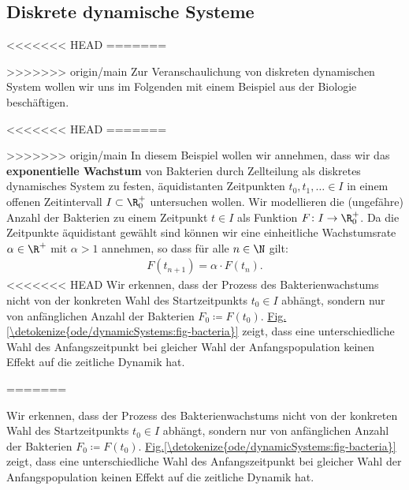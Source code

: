 \documentclass[letterpaper,10pt,english]{jupyterBook}
\begin{document}
\subsection{Diskrete dynamische Systeme}
\label{\detokenize{ode/dynamicSystems:diskrete-dynamische-systeme}}
<<<<<<< HEAD
=======
\par
>>>>>>> origin/main
Zur Veranschaulichung von diskreten dynamischen System wollen wir uns im Folgenden mit einem Beispiel aus der Biologie beschäftigen.
\label{ode/dynamicSystems:ex:bacteria}
\begin{example}{}{}



<<<<<<< HEAD
=======
\par
>>>>>>> origin/main
In diesem Beispiel wollen wir annehmen, dass wir das \textbf{exponentielle Wachstum} von Bakterien durch Zellteilung als diskretes dynamisches System zu festen, äquidistanten Zeitpunkten \(t_0, t_1, \ldots \in I\) in einem offenen Zeitintervall \(I\subset\R^+_0\) untersuchen wollen.
Wir modellieren die (ungefähre) Anzahl der Bakterien zu einem Zeitpunkt \(t \in I\) als Funktion \(F \colon I \rightarrow \R_0^+\).
Da die Zeitpunkte äquidistant gewählt sind können wir eine einheitliche Wachstumsrate \(\alpha \in \R^+\) mit \(\alpha > 1\) annehmen, so dass für alle \(n \in \N\) gilt:
\begin{align*}
F(t_{n+1}) = \alpha \cdot F(t_n).
\end{align*}
<<<<<<< HEAD
Wir erkennen, dass der Prozess des Bakterienwachstums nicht von der konkreten Wahl des Startzeitpunkts \(t_0 \in I\) abhängt, sondern nur von anfänglichen Anzahl der Bakterien \(F_0 \coloneqq F(t_0)\). \hyperref[\detokenize{ode/dynamicSystems:fig-bacteria}]{Fig.\@ \ref{\detokenize{ode/dynamicSystems:fig-bacteria}}} zeigt, dass eine unterschiedliche Wahl des Anfangszeitpunkt bei gleicher Wahl der Anfangspopulation keinen Effekt auf die zeitliche Dynamik hat.

=======
\par
Wir erkennen, dass der Prozess des Bakterienwachstums nicht von der konkreten Wahl des Startzeitpunkts \(t_0 \in I\) abhängt, sondern nur von anfänglichen Anzahl der Bakterien \(F_0 \coloneqq F(t_0)\). \hyperref[\detokenize{ode/dynamicSystems:fig-bacteria}]{Fig.\@ \ref{\detokenize{ode/dynamicSystems:fig-bacteria}}} zeigt, dass eine unterschiedliche Wahl des Anfangszeitpunkt bei gleicher Wahl der Anfangspopulation keinen Effekt auf die zeitliche Dynamik hat.


\end{example}
\end{document}
